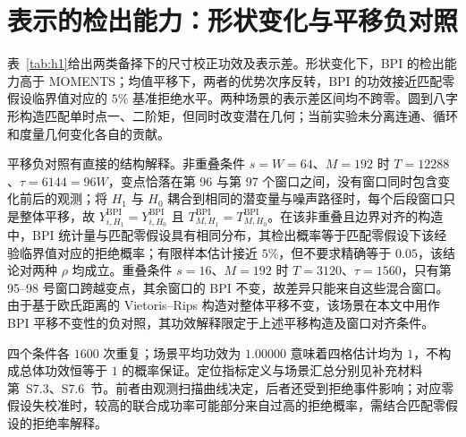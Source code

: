 \section{表示的检出能力：形状变化与平移负对照}\label{sec:h1}

表~\ref{tab:h1}给出两类备择下的尺寸校正功效及表示差。形状变化下，BPI 的检出能力高于 MOMENTS；均值平移下，两者的优势次序反转，BPI 的功效接近匹配零假设临界值对应的 $5\%$ 基准拒绝水平。两种场景的表示差区间均不跨零。圆到八字形构造匹配单时点一、二阶矩，但同时改变潜在几何；当前实验未分离连通、循环和度量几何变化各自的贡献。



平移负对照有直接的结构解释。非重叠条件 $s=W=64$、$M=192$ 时 $T=12288$、$\tau=6144=96W$，变点恰落在第 96 与第 97 个窗口之间，没有窗口同时包含变化前后的观测；将 $H_1$ 与 $H_0$ 耦合到相同的潜变量与噪声路径时，每个后段窗口只是整体平移，故 $Y_{i,H_1}^{\mathrm{BPI}}=Y_{i,H_0}^{\mathrm{BPI}}$ 且 $T_{M,H_1}^{\mathrm{BPI}}=T_{M,H_0}^{\mathrm{BPI}}$。在该非重叠且边界对齐的构造中，BPI 统计量与匹配零假设具有相同分布，其检出概率等于匹配零假设下该经验临界值对应的拒绝概率；有限样本估计接近 $5\%$，但不要求精确等于 $0.05$，该结论对两种 $\rho$ 均成立。重叠条件 $s=16$、$M=192$ 时 $T=3120$、$\tau=1560$，只有第 95--98 号窗口跨越变点，其余窗口的 BPI 不变，故差异只能来自这些混合窗口。由于基于欧氏距离的 Vietoris--Rips 构造对整体平移不变，该场景在本文中用作 BPI 平移不变性的负对照，其功效解释限定于上述平移构造及窗口对齐条件。

四个条件各 $1600$ 次重复；场景平均功效为 $1.00000$ 意味着四格估计均为 $1$，不构成总体功效恒等于 $1$ 的概率保证。定位指标定义与场景汇总分别见补充材料第~S7.3、S7.6~节。前者由观测扫描曲线决定，后者还受到拒绝事件影响；对应零假设失校准时，较高的联合成功率可能部分来自过高的拒绝概率，需结合匹配零假设的拒绝率解释。
